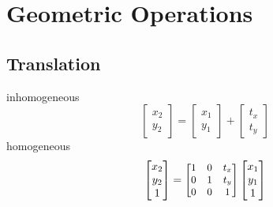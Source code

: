 \section{Geometric Operations}
\subsection{Translation}
inhomogeneous
\[\begin{bmatrix}
  x_2\\
  y_2
\end{bmatrix}=
\begin{bmatrix}
  x_1\\
  y_1
\end{bmatrix}+
\begin{bmatrix}
  t_x\\
  t_y
\end{bmatrix}\]
homogeneous
\[\begin{bmatrix}
  x_2\\
  y_2\\
  1
\end{bmatrix}=
{\small
\begin{bmatrix}
  1 & 0 & t_x\\
  0 & 1 & t_y\\
  0 & 0 & 1
\end{bmatrix}
}
\begin{bmatrix}
  x_1\\
  y_1\\
  1
\end{bmatrix}
\]
